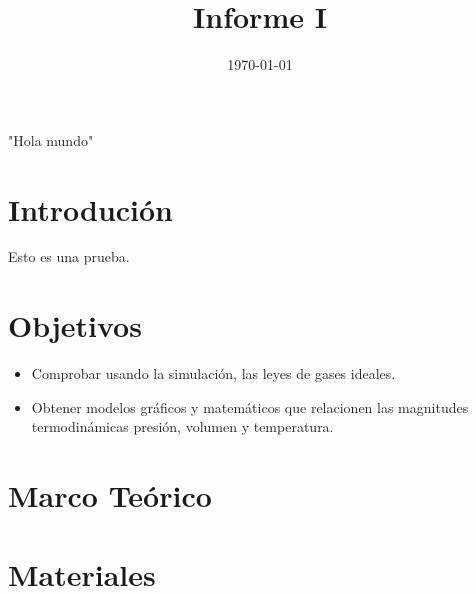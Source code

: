 \documentclass[]{article}
\title{Informe I}
\author{}
\date{\today}
\begin{document}
\maketitle  

"Hola mundo"

\tableofcontents
\section{Introdución}
Esto es una prueba.



\section{Objetivos}
\begin{itemize}
    \item Comprobar usando la simulación, las leyes de gases ideales.
    \item Obtener modelos gráficos y matemáticos que relacionen las magnitudes termodinámicas presión,
    volumen y temperatura.
\end{itemize}


\section{Marco Teórico}




\section{Materiales}


\end{document}
